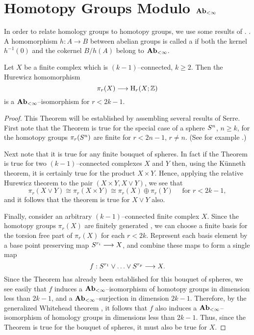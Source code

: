 \documentclass[../main]{subfiles}
\begin{document}
\section{Homotopy Groups Modulo \texorpdfstring{$\mathbf{Ab}_{<\infty}$}{Ab<infinity}}\label{sec:18.2}
In order to relate homology groups to homotopy groups, we use some results of \cite{serre}. . A homomorphism $h : A \longrightarrow B$ between abelian groups is called a  if both the kernel $h^{-1}(0)$ and the cokernel $B/h(A)$ belong to $\mathbf{Ab}_{<\infty}$. 

\begin{theorem}
\label{thm:18.3}
Let $X$ be a finite complex which is $(k - 1)$--connected, $k \ge 2$. Then the Hurewicz homomorphism \[\pi_r(X) \longrightarrow \operatorname{H}_r(X; \mathbb Z)\] is a $\mathbf{Ab}_{<\infty}$--isomorphism for $r < 2 k - 1$.
\end{theorem}

\begin{proof}
This Theorem will be established by assembling several results of Serre. First note that the Theorem is true for the special case of a sphere $S^n$, $n \ge k$, for the homotopy groups $\pi_r(S^n)$ are finite for $r < 2 n - 1$, $r \ne n$. (See for example \cite[pp. 515-516]{spanier1981}.)

Next note that it is true for any finite bouquet of spheres. In fact if the Theorem is true for two $(k - 1)$--connected complexes $X$ and $Y$ then, using the Künneth theorem, it is certainly true for the product $X \times Y$. Hence, applying the relative Hurewicz theorem to the pair $(X \times Y, X \vee Y)$, we see that \[\pi_r(X \vee Y) \cong \pi_r(X \times Y) \cong \pi_r(X) \oplus \pi_r(Y)\quad \text{ for }r < 2 k - 1,\] and it follows that the theorem is true for $X \vee Y$ also. 

Finally, consider an arbitrary $(k - 1)$--connected finite complex $X$. Since the homotopy groups $\pi_r(X)$ are finitely generated \cite[pp. 509]{spanier1981}, we can choose a finite basis for the torsion free part of $\pi_r(X)$ for each $r < 2 k$. Represent each basis element by a base point preserving map $S^{r_i} \longrightarrow X$, and combine these maps to form a single map \[f : S^{r_1} \vee \ldots \vee S^{r_p} \longrightarrow X.\] Since the Theorem has already been established for this bouquet of spheres, we see easily that $f$ induces a $\mathbf{Ab}_{<\infty}$--isomorphism of homotopy groups in dimension less than $2 k - 1$, and a $\mathbf{Ab}_{<\infty}$--surjection in dimension $2 k - 1$. Therefore, by the generalized Whitehead theorem \cite[pp. 512]{spanier1981}, it follows that $f$ also induces a $\mathbf{Ab}_{<\infty}$--isomorphism of homology groups in dimensions less than $2 k - 1$. Thus, since the Theorem is true for the bouquet of spheres, it must also be true for $X$. 
\end{proof}
\end{document}
